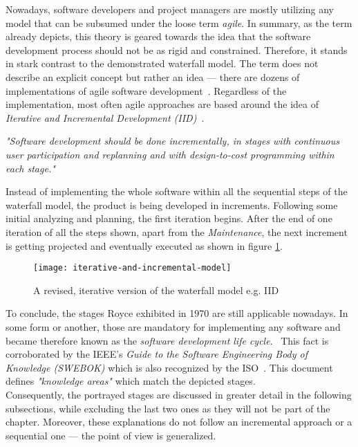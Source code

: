 \documentclass[12pt,a4paper]{report}
\begin{document}
Nowadays, software developers and project managers are mostly utilizing any model that
can be subsumed under the loose term \textit{agile}.
In summary, as the term already depicts, this theory is geared towards
the idea that the software development process should not be as rigid and constrained.
Therefore, it stands in stark contrast to the demonstrated waterfall model.
The term does not describe an explicit concept but rather an idea ---
there are dozens of implementations of agile software development~\cite{martin-agile-practices}.
Regardless of the implementation, most often agile approaches are based around
the idea of \textit{Iterative and Incremental Development (IID)}~\cite{larman-iid-history}.
\begin{displayquote}
\emph{"Software development should be done incrementally, in stages with
continuous user participation and replanning and
with design-to-cost programming within each stage."}~\cite{mills-iid}
\end{displayquote}
Instead of implementing the whole software within all the sequential steps
of the waterfall model, the product is being developed in increments.
Following some initial analyzing and planning, the first iteration begins.
After the end of one iteration of all the steps shown, apart from the \textit{Maintenance},
the next increment is getting projected and eventually executed as shown in figure \ref{fig:idd-model}.
\begin{figure}[htbp]
\centering
\texttt{[image: iterative-and-incremental-model]}
\caption{A revised, iterative version of the waterfall model e.g. IID}
\label{fig:idd-model}
\end{figure}\newline
To conclude, the stages Royce exhibited in 1970 are still applicable nowadays.
In some form or another, those are mandatory for implementing any software
and became therefore known as the \textit{software development life cycle}.~\cite{se-ieee}
This fact is corroborated by the IEEE's
\textit{Guide to the Software Engineering Body of Knowledge (SWEBOK)}
which is also recognized by the ISO~\cite{swebok}.
This document defines \textit{"knowledge areas"} which match the depicted stages.\\
Consequently, the portrayed stages are discussed in greater detail in the following subsections,
while excluding the last two ones as they will not be part of the
\textit{} chapter.
Moreover, these explanations do not follow an incremental approach
or a sequential one --- the point of view is generalized.
\end{document}
